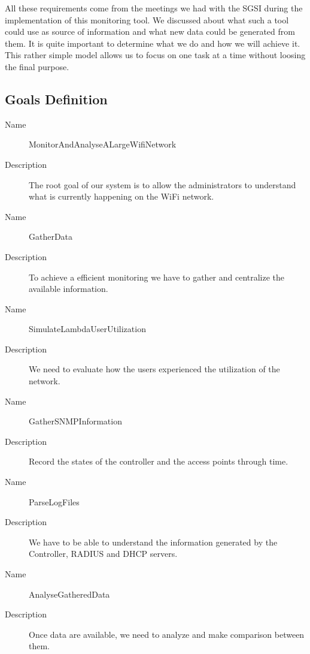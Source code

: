 All these requirements come from the meetings we had with the SGSI during the implementation of this monitoring tool. We discussed about what such a tool could use as source of information and what new data could be generated from them. It is quite important to determine what we do and how we will achieve it. This rather simple model allows us to focus on one task at a time without loosing the final purpose.

\subsection{Goals Definition}
\begin{description}
  \item[Name] MonitorAndAnalyseALargeWifiNetwork
  \item[Description] The root goal of our system is to allow the administrators to understand what is currently happening on the WiFi network.
\end{description}

\begin{description}
  \item[Name] GatherData
  \item[Description] To achieve a efficient monitoring we have to gather and centralize the available information. 
\end{description}

\begin{description}
  \item[Name] SimulateLambdaUserUtilization
  \item[Description] We need to evaluate how the users experienced the utilization of the network.
\end{description}

\begin{description}
  \item[Name] GatherSNMPInformation
  \item[Description] Record the states of the controller and the access points through time.
\end{description}

\begin{description}
  \item[Name] ParseLogFiles
  \item[Description] We have to be able to understand the information generated by the Controller, RADIUS and DHCP servers.
\end{description}

\begin{description}
  \item[Name] AnalyseGatheredData
  \item[Description] Once data are available, we need to analyze and make comparison between them.
\end{description}

